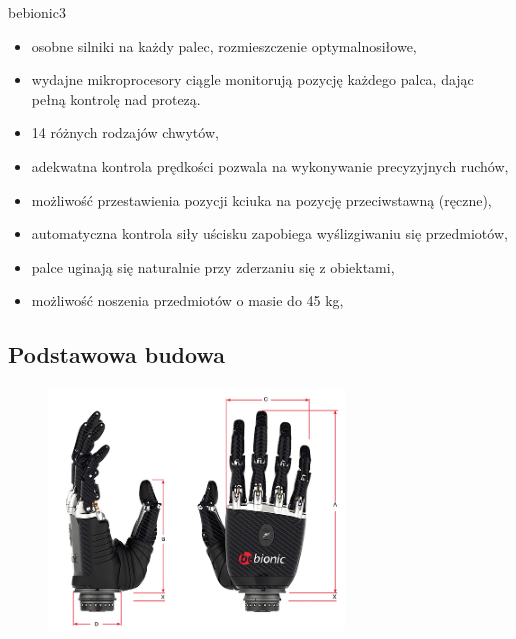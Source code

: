 \documentclass[8pt]{beamer}
\begin{document}
	\begin{frame}%
		bebionic3
		\begin{itemize}[<+->]
	\item osobne silniki na każdy palec, rozmieszczenie optymalnosiłowe,
	\item wydajne mikroprocesory ciągle monitorują pozycję każdego palca, dając pełną kontrolę nad protezą.
	\item 14 różnych rodzajów chwytów,
	\item adekwatna kontrola prędkości pozwala na wykonywanie precyzyjnych ruchów,
	\item możliwość przestawienia pozycji kciuka na pozycję przeciwstawną (ręczne),
	\item automatyczna kontrola siły uścisku zapobiega wyślizgiwaniu się przedmiotów,
	\item palce uginają się naturalnie przy zderzaniu się z obiektami,
	\item możliwość noszenia przedmiotów o masie do 45 kg,
		\end{itemize}

	\end{frame}

	\subsection{Podstawowa budowa}
	\begin{frame}
	\begin{center}
				\begin{figure}
					\includegraphics[width=0.7\textwidth]{graphics/bebionic_dimentions.jpg}
					\label{graph:grasp}	
					\caption{ \cite{bebionic}}
				\end{figure}
			\end{center}
	\end{frame}		
	
\end{document}
